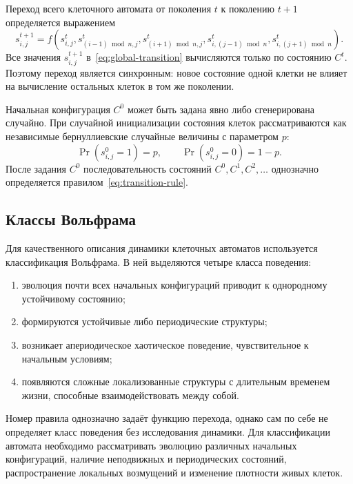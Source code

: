Переход всего клеточного автомата от поколения $t$ к поколению $t+1$
определяется выражением
\begin{equation}
    s^{t+1}_{i,j} = f\left(
        s^t_{i,j},
        s^t_{(i-1)\bmod n,j},
        s^t_{(i+1)\bmod n,j},
        s^t_{i,(j-1)\bmod n},
        s^t_{i,(j+1)\bmod n}
    \right).
    \label{eq:global-transition}
\end{equation}
Все значения $s^{t+1}_{i,j}$ в~\eqref{eq:global-transition} вычисляются только
по состоянию $C^t$. Поэтому переход является синхронным: новое состояние
одной клетки не влияет на вычисление остальных клеток в том же поколении.

Начальная конфигурация $C^0$ может быть задана явно либо сгенерирована
случайно. При случайной инициализации состояния клеток рассматриваются как
независимые бернуллиевские случайные величины с параметром $p$:
\begin{equation}
    \Pr\left(s^0_{i,j}=1\right)=p,
    \qquad
    \Pr\left(s^0_{i,j}=0\right)=1-p.
\end{equation}
После задания $C^0$ последовательность состояний
$C^0,C^1,C^2,\ldots$ однозначно определяется правилом~\eqref{eq:transition-rule}.

\subsection{Классы Вольфрама}

Для качественного описания динамики клеточных автоматов используется
классификация Вольфрама. В ней выделяются четыре класса поведения:
\begin{enumerate}
    \item эволюция почти всех начальных конфигураций приводит к однородному
        устойчивому состоянию;
    \item формируются устойчивые либо периодические структуры;
    \item возникает апериодическое хаотическое поведение, чувствительное к
        начальным условиям;
    \item появляются сложные локализованные структуры с длительным временем
        жизни, способные взаимодействовать между собой.
\end{enumerate}

Номер правила однозначно задаёт функцию перехода, однако сам по себе не
определяет класс поведения без исследования динамики. Для классификации
автомата необходимо рассматривать эволюцию различных начальных конфигураций,
наличие неподвижных и периодических состояний, распространение локальных
возмущений и изменение плотности живых клеток.


